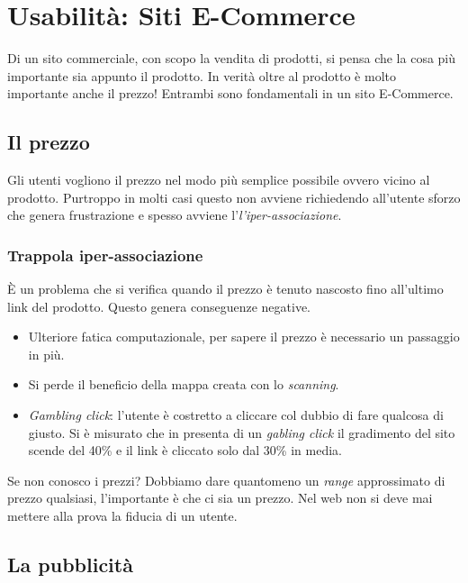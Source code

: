 
\section{Usabilità: Siti E-Commerce}
	Di un sito commerciale, con scopo la vendita di prodotti, si pensa che la cosa più importante sia appunto il prodotto. In verità oltre al prodotto è molto importante anche il prezzo! Entrambi sono fondamentali in un sito E-Commerce.

	\subsection{Il prezzo}
		Gli utenti vogliono il prezzo nel modo più semplice possibile ovvero vicino al prodotto. Purtroppo in molti casi questo non avviene richiedendo all'utente sforzo che genera frustrazione e spesso avviene l'\emph{l'iper-associazione}.
	
		\subsubsection{Trappola iper-associazione}
			È un problema che si verifica quando il prezzo è tenuto nascosto fino all'ultimo link del prodotto. Questo genera conseguenze negative.
			\begin{itemize}
				\item Ulteriore fatica computazionale, per sapere il prezzo è necessario un passaggio in più.
				\item Si perde il beneficio della mappa creata con lo \emph{scanning}.
				\item \emph{Gambling click}: l'utente è costretto a cliccare col dubbio di fare qualcosa di giusto. Si è misurato che in presenta di un \emph{gabling click} il gradimento del sito scende del 40\% e il link è cliccato solo dal 30\% in media.
			\end{itemize}
			Se non conosco i prezzi? Dobbiamo dare quantomeno un \emph{range} approssimato di prezzo qualsiasi, l'importante è che ci sia un prezzo. Nel web non si deve mai mettere alla prova la fiducia di un utente.
	
	\subsection{La pubblicità}
		
